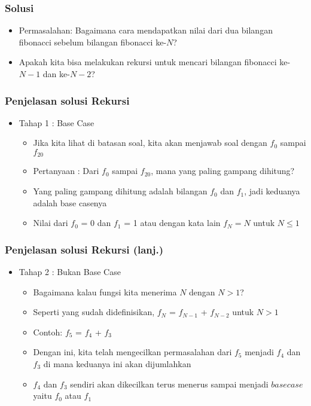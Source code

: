 \begin{frame}
\frametitle{Solusi}
\begin{itemize}
  \item Permasalahan: Bagaimana cara mendapatkan nilai dari dua bilangan fibonacci sebelum bilangan fibonacci ke-$N$?
  \item Apakah kita bisa melakukan rekursi untuk mencari bilangan fibonacci ke-${N-1}$ dan ke-${N-2}$?
\end{itemize}
\end{frame}

\begin{frame}
\frametitle{Penjelasan solusi Rekursi}
\begin{itemize}
  \item Tahap 1 : Base Case
  \begin {itemize}
    \item Jika kita lihat di batasan soal, kita akan menjawab soal dengan $f_0$ sampai $f_{20}$
    \item Pertanyaan : Dari $f_0$ sampai $f_{20}$, mana yang paling gampang dihitung?
    \item Yang paling gampang dihitung adalah bilangan $f_0$ dan $f_1$, jadi keduanya adalah base casenya
    \item Nilai dari $f_0$ = 0 dan $f_1$ = 1 atau dengan kata lain $f_N = N$ untuk $N \le 1$
  \end {itemize}
\end{itemize}
\end{frame}

\begin{frame}
\frametitle{Penjelasan solusi Rekursi (lanj.) }
\begin{itemize}
  \item Tahap 2 : Bukan Base Case
  \begin {itemize}
    \item Bagaimana kalau fungsi kita menerima $N$ dengan $N > 1$?
    \item Seperti yang sudah didefinisikan, $f_N$ = $f_{N-1}$ + $f_{N-2}$ untuk $N > 1$
    \item Contoh: $f_5$ = $f_4$ + $f_3$
    \item Dengan ini, kita telah mengecilkan permasalahan dari $f_5$ menjadi $f_4$ dan $f_3$ di mana keduanya ini akan dijumlahkan
    \item $f_4$ dan $f_3$ sendiri akan dikecilkan terus menerus sampai menjadi $base case$ yaitu $f_0$ atau $f_1$
  \end {itemize}
\end{itemize}
\end{frame}

